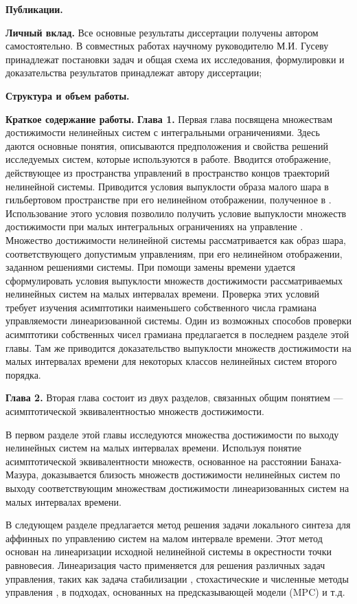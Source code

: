 \documentclass[../main.tex]{subfiles}
\begin{document}
\textbf{Публикации.}

\textbf{Личный вклад.} Все основные результаты диссертации получены автором самостоятельно.  В совместных работах научному руководителю М.И. Гусеву принадлежат постановки задач и общая схема их исследования, формулировки и доказательства результатов принадлежат автору диссертации;

\textbf{Структура и объем работы.}

\textbf{Краткое содержание работы.}  \textbf{Глава 1. } 
Первая глава посвящена множествам достижимости нелинейных систем с интегральными ограничениями. 
Здесь даются основные понятия, описываются предположения и свойства решений исследуемых систем, которые используются в работе. 
Вводится отображение, действующее из пространства управлений в пространство концов траекторий нелинейной системы. 
Приводится условия выпуклости образа малого шара в гильбертовом пространстве при его нелинейном отображении, полученное в \cite{Polyak2001}. 
Использование этого условия позволило получить условие выпуклости множеств достижимости при малых интегральных ограничениях на управление \cite{Polyak2004}.
Множество достижимости нелинейной системы рассматривается как образ шара, соответствующего допустимым управлениям, при его нелинейном отображении, заданном решениями системы.
При помощи замены времени удается сформулировать условия выпуклости множеств достижимости рассматриваемых нелинейных систем на малых интервалах времени. 
Проверка этих условий требует изучения асимптотики наименьшего собственного числа грамиана управляемости линеаризованной системы.
Один из возможных способов проверки асимптотики собственных чисел грамиана предлагается в последнем разделе этой главы. 
Там же приводится доказательство выпуклости множеств достижимости на малых интервалах времени для некоторых классов нелинейных систем второго порядка. 

\textbf{Глава 2. }
Вторая глава состоит из двух разделов, связанных общим понятием --- асимптотической эквивалентностью множеств достижимости. 

В первом разделе этой главы исследуются множества достижимости по выходу нелинейных систем на малых интервалах времени.
Используя понятие асимптотической эквивалентности множеств\cite{Ovs}, основанное на расстоянии Банаха-Мазура\cite{Thompson}, доказывается близость множеств достижимости нелинейных систем по выходу соответствующим множествам достижимости линеаризованных систем на малых интервалах времени. 

В следующем разделе предлагается метод решения задачи локального синтеза для аффинных по управлению систем на малом интервале времени.  
Этот метод основан на линеаризации исходной нелинейной системы в окрестности точки равновесия. 
Линеаризация часто применяется для решения различных задач управления, таких как задача стабилизации \cite{Kras_add,Khalil}, стохастические и численные методы управления \cite{Roxin,EKF,denBerg,Pang}, в подходах, основанных на предсказывающей модели (MPC) \cite{Murillo,LTV_MPC} и т.д.
\end{document}
